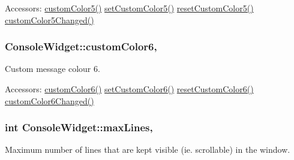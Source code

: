 \begin{DoxyParagraph}{Accessors\-:}
\hyperlink{class_console_widget_ae5df9bbf98d2604e2ce96940910cfd8a}{custom\-Color5()} \hyperlink{class_console_widget_a361194a1e900563462e7639331e1fb4c}{set\-Custom\-Color5()} \hyperlink{class_console_widget_a30cf8697ccef1adbd6b21a91ca4aceb1}{reset\-Custom\-Color5()} \hyperlink{class_console_widget_a1d2c4dee435697402c0e4b482bd051bc}{custom\-Color5\-Changed()} 
\end{DoxyParagraph}
\hypertarget{class_console_widget_a73a019be0c62bb011fca904dd029a83b}{
\subsubsection[{custom\-Color6}]{\setlength{\rightskip}{0pt plus 5cm}Console\-Widget\-::custom\-Color6\hspace{0.3cm}{\ttfamily [read]}, {\ttfamily [write]}}}\label{class_console_widget_a73a019be0c62bb011fca904dd029a83b}


Custom message colour 6. 

\begin{DoxyParagraph}{Accessors\-:}
\hyperlink{class_console_widget_a73a019be0c62bb011fca904dd029a83b}{custom\-Color6()} \hyperlink{class_console_widget_a6ce29c64f664955b37065c7ba84bfd00}{set\-Custom\-Color6()} \hyperlink{class_console_widget_a2e8fe2f9d7e27f923294a93be8c4f702}{reset\-Custom\-Color6()} \hyperlink{class_console_widget_a8f9b8bb7e73504bbbd80b07cb36381cb}{custom\-Color6\-Changed()} 
\end{DoxyParagraph}
\hypertarget{class_console_widget_afef59d721756f56c09780682aa0e7fac}{
\subsubsection[{max\-Lines}]{\setlength{\rightskip}{0pt plus 5cm}int Console\-Widget\-::max\-Lines\hspace{0.3cm}{\ttfamily [read]}, {\ttfamily [write]}}}\label{class_console_widget_afef59d721756f56c09780682aa0e7fac}


Maximum number of lines that are kept visible (ie. scrollable) in the window. 


